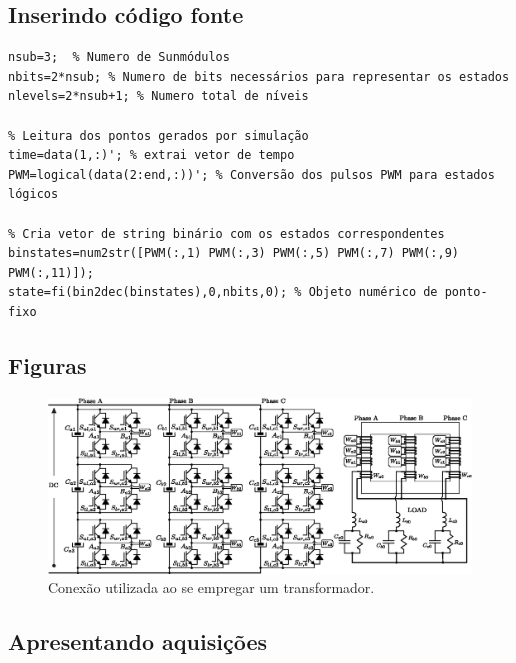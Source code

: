 \documentclass[
	article,			%
	12pt,				%
	twoside,			%
	a4paper,			%
	english,			%
	brazil,				%
	sumario=tradicional
	]{abntex2-modelo-notas-de-aula}
\begin{document}
\subsection{Inserindo código fonte}

\begin{lstlisting}[caption={Leitura dos dados simulados e conversão para estados topológicos.},label={lst:leituradadossim}]
% Pré definições iniciais
nsub=3;  % Numero de Sunmódulos
nbits=2*nsub; % Numero de bits necessários para representar os estados
nlevels=2*nsub+1; % Numero total de níveis

% Leitura dos pontos gerados por simulação
time=data(1,:)'; % extrai vetor de tempo
PWM=logical(data(2:end,:))'; % Conversão dos pulsos PWM para estados lógicos

% Cria vetor de string binário com os estados correspondentes
binstates=num2str([PWM(:,1) PWM(:,3) PWM(:,5) PWM(:,7) PWM(:,9) PWM(:,11)]);
state=fi(bin2dec(binstates),0,nbits,0); % Objeto numérico de ponto-fixo
\end{lstlisting}

\subsection{Figuras}



\begin{figure}[!h]
	\centering
	\includegraphics[width=1\linewidth]{figs/InversorTransformador}
	\caption{Conexão utilizada ao se empregar um transformador.}
	\label{fig:InversorTransformador}
\end{figure}


\subsection{Apresentando aquisições}
\end{document}

